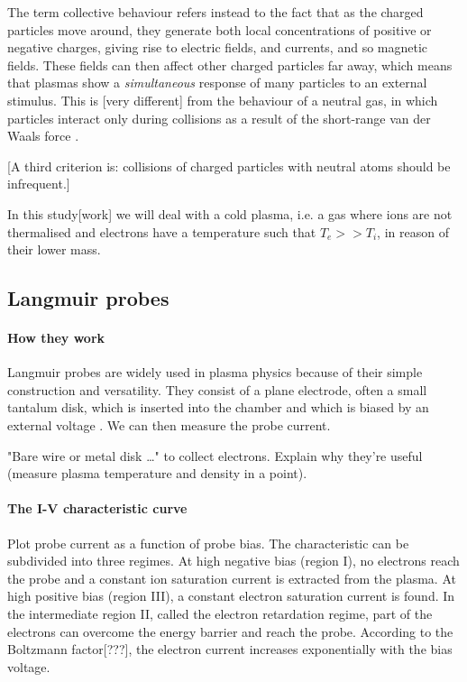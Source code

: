 The term collective behaviour refers instead to the fact that as the charged particles move around, they generate both local concentrations of positive or negative charges, giving rise to electric fields, and currents, and so magnetic fields\cite{chen_introduction_2006}.
These fields can then affect other charged particles far away\footnotemark, which means that plasmas show a \emph{simultaneous} response of many particles to an external stimulus\footnotemark.
This is [very different] from the behaviour of a neutral gas, in which particles interact only during collisions as a result of the short-range van der Waals force \cite{piel_plasma_2017}.

[A third criterion is: collisions of charged particles with neutral atoms should be infrequent.]

In this study[work] we will deal with a cold plasma, i.e. a gas where ions are not thermalised and electrons have a temperature such that $T_e >> T_i$, in reason of their lower mass\cite{bagnato_notice_2019}.

\subsection{Langmuir probes}
\paragraph{How they work}
Langmuir probes are widely used in plasma physics because of their simple construction and versatility.
They consist of a plane electrode, often a small tantalum disk, which is inserted into the chamber and which is biased by an external voltage \cite{piel_plasma_2017}.
We can then measure the probe current.

"Bare wire or metal disk \ldots" to collect electrons.
Explain why they're useful (measure plasma temperature and density in a point).

\paragraph{The I-V characteristic curve}
Plot probe current as a function of probe bias.
The characteristic can be subdivided into three regimes. At high negative bias (region I),
no electrons reach the probe and a constant ion saturation current is extracted from
the plasma. At high positive bias (region III), a constant electron saturation current
is found. 
In the intermediate region II,
called the electron retardation regime, part of the electrons can overcome the energy
barrier and reach the probe. According to the Boltzmann factor[???], the electron current
increases exponentially with the bias voltage.

